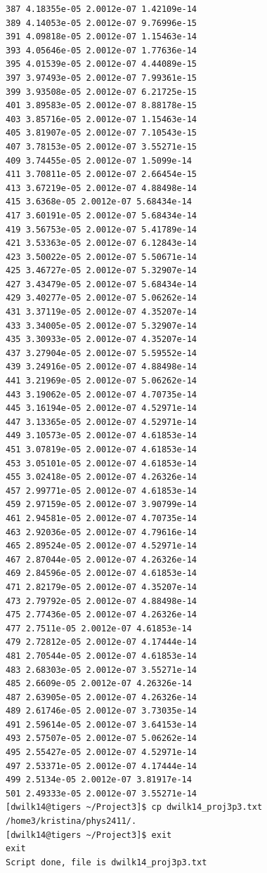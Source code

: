 \documentclass{article}
\begin{document}
\begin{verbatim}
387 4.18355e-05 2.0012e-07 1.42109e-14
389 4.14053e-05 2.0012e-07 9.76996e-15
391 4.09818e-05 2.0012e-07 1.15463e-14
393 4.05646e-05 2.0012e-07 1.77636e-14
395 4.01539e-05 2.0012e-07 4.44089e-15
397 3.97493e-05 2.0012e-07 7.99361e-15
399 3.93508e-05 2.0012e-07 6.21725e-15
401 3.89583e-05 2.0012e-07 8.88178e-15
403 3.85716e-05 2.0012e-07 1.15463e-14
405 3.81907e-05 2.0012e-07 7.10543e-15
407 3.78153e-05 2.0012e-07 3.55271e-15
409 3.74455e-05 2.0012e-07 1.5099e-14
411 3.70811e-05 2.0012e-07 2.66454e-15
413 3.67219e-05 2.0012e-07 4.88498e-14
415 3.6368e-05 2.0012e-07 5.68434e-14
417 3.60191e-05 2.0012e-07 5.68434e-14
419 3.56753e-05 2.0012e-07 5.41789e-14
421 3.53363e-05 2.0012e-07 6.12843e-14
423 3.50022e-05 2.0012e-07 5.50671e-14
425 3.46727e-05 2.0012e-07 5.32907e-14
427 3.43479e-05 2.0012e-07 5.68434e-14
429 3.40277e-05 2.0012e-07 5.06262e-14
431 3.37119e-05 2.0012e-07 4.35207e-14
433 3.34005e-05 2.0012e-07 5.32907e-14
435 3.30933e-05 2.0012e-07 4.35207e-14
437 3.27904e-05 2.0012e-07 5.59552e-14
439 3.24916e-05 2.0012e-07 4.88498e-14
441 3.21969e-05 2.0012e-07 5.06262e-14
443 3.19062e-05 2.0012e-07 4.70735e-14
445 3.16194e-05 2.0012e-07 4.52971e-14
447 3.13365e-05 2.0012e-07 4.52971e-14
449 3.10573e-05 2.0012e-07 4.61853e-14
451 3.07819e-05 2.0012e-07 4.61853e-14
453 3.05101e-05 2.0012e-07 4.61853e-14
455 3.02418e-05 2.0012e-07 4.26326e-14
457 2.99771e-05 2.0012e-07 4.61853e-14
459 2.97159e-05 2.0012e-07 3.90799e-14
461 2.94581e-05 2.0012e-07 4.70735e-14
463 2.92036e-05 2.0012e-07 4.79616e-14
465 2.89524e-05 2.0012e-07 4.52971e-14
467 2.87044e-05 2.0012e-07 4.26326e-14
469 2.84596e-05 2.0012e-07 4.61853e-14
471 2.82179e-05 2.0012e-07 4.35207e-14
473 2.79792e-05 2.0012e-07 4.88498e-14
475 2.77436e-05 2.0012e-07 4.26326e-14
477 2.7511e-05 2.0012e-07 4.61853e-14
479 2.72812e-05 2.0012e-07 4.17444e-14
481 2.70544e-05 2.0012e-07 4.61853e-14
483 2.68303e-05 2.0012e-07 3.55271e-14
485 2.6609e-05 2.0012e-07 4.26326e-14
487 2.63905e-05 2.0012e-07 4.26326e-14
489 2.61746e-05 2.0012e-07 3.73035e-14
491 2.59614e-05 2.0012e-07 3.64153e-14
493 2.57507e-05 2.0012e-07 5.06262e-14
495 2.55427e-05 2.0012e-07 4.52971e-14
497 2.53371e-05 2.0012e-07 4.17444e-14
499 2.5134e-05 2.0012e-07 3.81917e-14
501 2.49333e-05 2.0012e-07 3.55271e-14
[dwilk14@tigers ~/Project3]$ cp dwilk14_proj3p3.txt /home3/kristina/phys2411/.
[dwilk14@tigers ~/Project3]$ exit
exit
Script done, file is dwilk14_proj3p3.txt
\end{verbatim}
\end{document}
